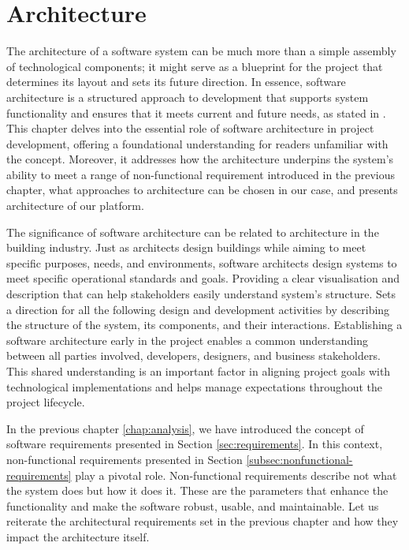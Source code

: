 \chapter{Architecture}
\label{chap:architectural-design}
The architecture of a software system can be much more than a simple assembly of technological components; it might serve as a blueprint for the project that determines its layout and sets its future direction.
In essence, software architecture is a structured approach to development that supports system functionality and ensures that it meets current and future needs, as stated in \cite{sommervilleSW}.
This chapter delves into the essential role of software architecture in project development, offering a foundational understanding for readers unfamiliar with the concept.
Moreover, it addresses how the architecture underpins the system’s ability to meet a range of non-functional requirement introduced in the previous chapter, what approaches to architecture can be chosen in our case, and presents architecture of our platform.

The significance of software architecture can be related to architecture in the building industry.
Just as architects design buildings while aiming to meet specific purposes, needs, and environments, software architects design systems to meet specific operational standards and goals.
Providing a clear visualisation and description that can help stakeholders easily understand system's structure.
Sets a direction for all the following design and development activities by describing the structure of the system, its components, and their interactions.
Establishing a software architecture early in the project enables a common understanding between all parties involved, developers, designers, and business stakeholders.
This shared understanding is an important factor in aligning project goals with technological implementations and helps manage expectations throughout the project lifecycle.



In the previous chapter \ref{chap:analysis}, we have introduced the concept of software requirements presented in Section \ref{sec:requirements}.
In this context, non-functional requirements presented in Section \ref{subsec:nonfunctional-requirements} play a pivotal role.
Non-functional requirements describe not what the system does but how it does it.
These are the parameters that enhance the functionality and make the software robust, usable, and maintainable.
Let us reiterate the architectural requirements set in the previous chapter and how they impact the architecture itself.

